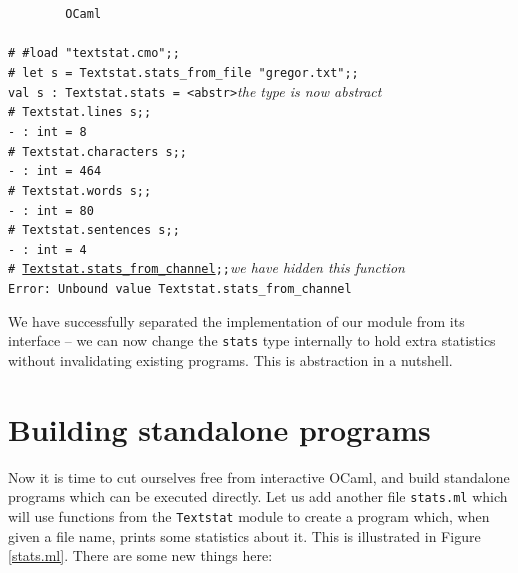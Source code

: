 \documentclass[]{book}
\newcommand{\smspace}{\vspace{4mm}}
\begin{document}
\smspace
\noindent\verb!        OCaml!\\
\noindent\\
\texttt{\# \#load "textstat.cmo";;}\\
\texttt{\#\ let\ s\ =\ Textstat.stats\_from\_file "gregor.txt";;}\\
\texttt{val s :\ Textstat.stats = <abstr>}\hfill\textit{the type is now abstract}\\
\texttt{\# Textstat.lines s;;}\\
\texttt{- :\ int = 8}\\
\texttt{\# Textstat.characters s;;}\\
\texttt{- :\ int = 464}\\
\texttt{\# Textstat.words s;;}\\
\texttt{- :\ int = 80}\\
\texttt{\# Textstat.sentences s;;}\\
\texttt{- :\ int = 4}\\
\texttt{\# \underline{Textstat.stats\_from\_channel\vphantom{g}};;}\hfill\textit{we have hidden this function}\\
\texttt{Error:\ Unbound value Textstat.stats\_from\_channel}\vphantom{g}
\smspace

\noindent We have successfully separated the implementation of our module from its interface -- we can now change the \texttt{stats} type internally to hold extra statistics without invalidating existing programs. This is abstraction in a nutshell.
 
\section*{Building standalone programs}

Now it is time to cut ourselves free from interactive OCaml, and build standalone programs which can be executed directly. Let us add another file \texttt{stats.ml} which  will use functions from the \texttt{Textstat} module to create a program which, when given a file name, prints some statistics about it. This is illustrated in Figure \ref{stats.ml}. There are some new things here:
\end{document}
